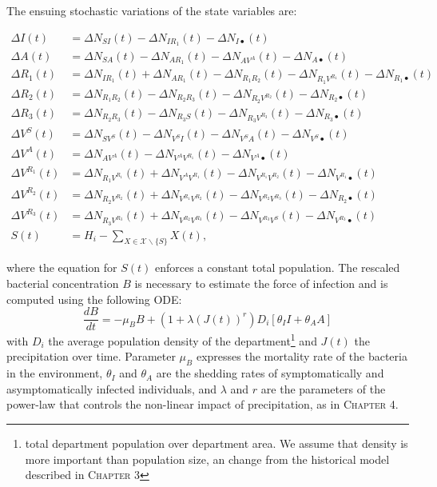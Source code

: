 The ensuing stochastic variations of the state variables are:
\begin{fullwidth}
\begingroup
\allowdisplaybreaks
\label{eq:stochstates}
\begin{align}
    \Delta I(t) &= \Delta N_{SI}(t) -  \Delta N_{IR_1}(t) -  \Delta N_{I\bullet}(t)\\
    \Delta A(t) &= \Delta N_{SA}(t) -  \Delta N_{AR_1}(t) -  \Delta N_{AV^A}(t) - \Delta N_{A\bullet}(t)\\
    \Delta R_1(t) &= \Delta N_{IR_1}(t) + \Delta N_{AR_1}(t) -  \Delta N_{R_1 R_2}(t) -  \Delta N_{R_1V^{R_1}}(t) -  \Delta N_{R_1\bullet}(t)\\
    \Delta R_2(t) &= \Delta N_{R_1R_2}(t) - \Delta N_{R_2 R_3}(t) -  \Delta N_{R_2V^{R_2}}(t) -  \Delta N_{R_2\bullet}(t)\\
    \Delta R_3(t) &= \Delta N_{R_2R_3}(t) - \Delta N_{R_3 S}(t) -  \Delta N_{R_3V^{R_3}}(t) -  \Delta N_{R_3\bullet}(t)\\
    \Delta V^S(t) &= \Delta N_{SV^S}(t) -  \Delta N_{V^S I}(t)-  \Delta N_{V^S A}(t) - \Delta N_{V^S\bullet}(t)\\
    \Delta V^A(t) &= \Delta N_{AV^A}(t) -  \Delta N_{V^AV^{R_1}}(t) - \Delta N_{V^A\bullet}(t)\\
    \Delta V^{R_1}(t) &= \Delta N_{R_1V^{R_1}}(t) +  \Delta N_{V^AV^{R_1}}(t) - \Delta N_{V^{R_1}V^{R_2}}(t) - \Delta N_{V^{R_1}\bullet}(t)\\
    \Delta V^{R_2}(t) &=\Delta N_{R_2V^{R_2}}(t)+\Delta N_{V^{R_1} V^{R_2}}(t) -  \Delta N_{V^{R_2}V^{R_3}}(t) -  \Delta N_{R_2\bullet}(t)\\
    \Delta V^{R_3}(t) &= \Delta N_{R_3V^{R_3}}(t)+\Delta N_{V^{R_2}V^{R_3}}(t) - \Delta N_{V^{R_3}V^ S}(t) - \Delta N_{V^{R_3}\bullet}(t)\\
    S(t) &= H_i - \sum_{X \in \mathcal{X} \backslash \{S\}} X(t),
\end{align}
\endgroup
\end{fullwidth}
where the equation for $S(t)$ enforces a constant total population. 
The rescaled bacterial concentration $B$ is necessary to estimate the force of infection and is computed using the following ODE:
\begin{equation}
\frac{dB}{dt} = - \mu_B B +  \left(1 + \lambda\left( J(t)\right)^{r} \right)  D_i \left[\theta_I I + \theta_A A\right] 
\end{equation}
with $D_i$ the average population density of the department\footnote{total department population over department area. We assume that density is more important than population size, an change from the historical model described in \textsc{Chapter 3}} and $J(t)$ the precipitation over time. Parameter $\mu_B$ expresses the mortality rate of the bacteria in the environment, $\theta_I$ and $\theta_A$ are the shedding rates of symptomatically and asymptomatically infected individuals, and $\lambda$ and $r$ are the parameters of the power-law that controls the non-linear impact of precipitation, as in \textsc{Chapter 4}.


